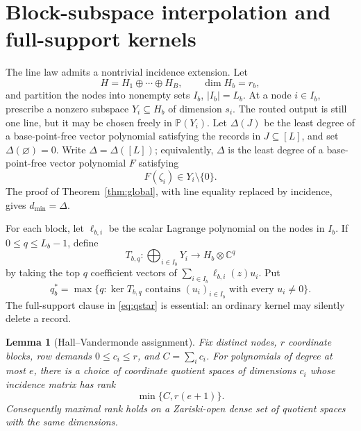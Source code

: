 \documentclass[11pt]{article}
\newtheorem{lemma}[theorem]{Lemma}
\theoremstyle{definition}\newtheorem{definition}[theorem]{Definition}\newtheorem{example}[theorem]{Example}
\theoremstyle{remark}\newtheorem{remark}[theorem]{Remark}\newtheorem{limitation}[theorem]{Limitation}
\newcommand{\C}{\mathbb C}\newcommand{\D}{\mathbb D}\newcommand{\T}{\mathbb T}
\newcommand{\PP}{\mathbb P}\newcommand{\rank}{\operatorname{rank}}
\begin{document}
\section{Block-subspace interpolation and full-support kernels}

The line law admits a nontrivial incidence extension.  Let
\[
 H=H_1\oplus\cdots\oplus H_B,\qquad \dim H_b=r_b,
\]
and partition the nodes into nonempty sets $I_b$, $|I_b|=L_b$.  At a node
$i\in I_b$, prescribe a nonzero subspace $Y_i\subseteq H_b$ of dimension
$s_i$.  The routed output is still one line, but it may be chosen freely in
$\PP(Y_i)$.  Let $\Delta(J)$ be the least degree of a base-point-free vector
polynomial satisfying the records in $J\subseteq[L]$, and set
$\Delta(\varnothing)=0$.  Write $\Delta=\Delta([L])$; equivalently, $\Delta$
is the least degree of a base-point-free vector
polynomial $F$ satisfying
\begin{equation}\label{eq:incidence}
                         F(\zeta_i)\in Y_i\setminus\{0\}.
\end{equation}
The proof of Theorem~\ref{thm:global}, with line equality replaced by
incidence, gives $d_{\min}=\Delta$.

For each block, let $\ell_{b,i}$ be the scalar Lagrange polynomial on the
nodes in $I_b$.  If $0\le q\le L_b-1$, define
\[
 T_{b,q}:\bigoplus_{i\in I_b}Y_i\longrightarrow H_b\otimes\C^q
\]
by taking the top $q$ coefficient vectors of
$\sum_{i\in I_b}\ell_{b,i}(z)u_i$.  Put
\begin{equation}\label{eq:qstar}
 q_b^*=\max\{q:\ker T_{b,q}\text{ contains }(u_i)_{i\in I_b}
                       \text{ with every }u_i\ne0\}.
\end{equation}
The full-support clause in \eqref{eq:qstar} is essential: an ordinary kernel
may silently delete a record.

\begin{lemma}[Hall--Vandermonde assignment]\label{lem:hall-vandermonde}
Fix distinct nodes, $r$ coordinate blocks, row demands
$0\le c_i\le r$, and $C=\sum_i c_i$.  For polynomials of degree at most $e$,
there is a choice of coordinate quotient spaces of dimensions $c_i$ whose
incidence matrix has rank
\[
                         \min\{C,r(e+1)\}.
\]
Consequently maximal rank holds on a Zariski-open dense set of quotient
spaces with the same dimensions.
\end{lemma}
\end{document}
